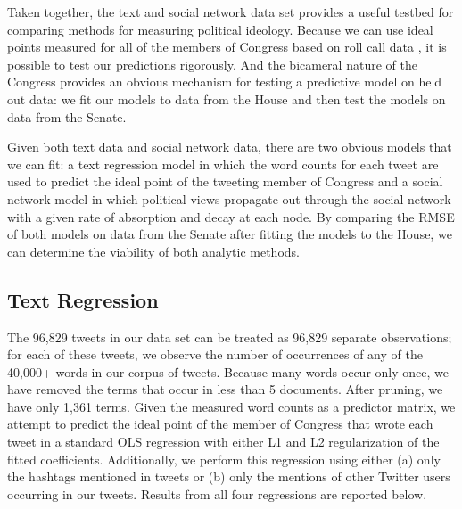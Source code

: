 \documentclass[10pt]{article}
\begin{document}
Taken together, the text and social network data set provides a useful testbed for comparing methods for measuring political ideology. Because we can use ideal points measured for all of the members of Congress based on roll call data \citep{Jackman_2001}, it is possible to test our predictions rigorously. And the bicameral nature of the Congress provides an obvious mechanism for testing a predictive model on held out data: we fit our models to data from the House and then test the models on data from the Senate.

Given both text data and social network data, there are two obvious models that we can fit: a text regression model in which the word counts for each tweet are used to predict the ideal point of the tweeting member of Congress and a social network model in which political views propagate out through the social network with a given rate of absorption and decay at each node. By comparing the RMSE of both models on data from the Senate after fitting the models to the House, we can determine the viability of both analytic methods.

\subsection{Text Regression}
The 96,829 tweets in our data set can be treated as 96,829 separate observations; for each of these tweets, we observe the number of occurrences of any of the 40,000+ words in our corpus of tweets. Because many words occur only once, we have removed the terms that occur in less than 5 documents. After pruning, we have only 1,361 terms. Given the measured word counts as a predictor matrix, we attempt to predict the ideal point of the member of Congress that wrote each tweet in a standard OLS regression with either L1 and L2 regularization of the fitted coefficients. Additionally, we perform this regression using either (a) only the hashtags mentioned in tweets or (b) only the mentions of other Twitter users occurring in our tweets. Results from all four regressions are reported below.

\end{document}
